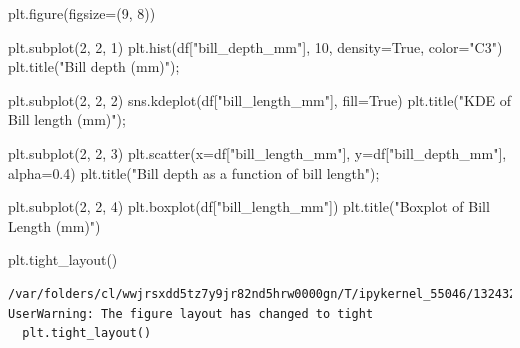\documentclass[
  letterpaper,
  krantz2]{{[}./krantz{]}}
\newenvironment{Shaded}{\begin{snugshade}}{\end{snugshade}}
\newcommand{\DecValTok}[1]{\textcolor[rgb]{0.68,0.00,0.00}{#1}}
\newcommand{\FloatTok}[1]{\textcolor[rgb]{0.68,0.00,0.00}{#1}}
\newcommand{\NormalTok}[1]{\textcolor[rgb]{0.00,0.23,0.31}{#1}}
\newcommand{\OperatorTok}[1]{\textcolor[rgb]{0.37,0.37,0.37}{#1}}
\newcommand{\StringTok}[1]{\textcolor[rgb]{0.13,0.47,0.30}{#1}}
\newcommand{\VariableTok}[1]{\textcolor[rgb]{0.07,0.07,0.07}{#1}}
\begin{document}
\begin{Shaded}
\begin{Highlighting}[]
\NormalTok{plt.figure(figsize}\OperatorTok{=}\NormalTok{(}\DecValTok{9}\NormalTok{, }\DecValTok{8}\NormalTok{))}

\NormalTok{plt.subplot(}\DecValTok{2}\NormalTok{, }\DecValTok{2}\NormalTok{, }\DecValTok{1}\NormalTok{)}
\NormalTok{plt.hist(df[}\StringTok{"bill\_depth\_mm"}\NormalTok{], }\DecValTok{10}\NormalTok{, density}\OperatorTok{=}\VariableTok{True}\NormalTok{, color}\OperatorTok{=}\StringTok{"C3"}\NormalTok{)}
\NormalTok{plt.title(}\StringTok{"Bill depth (mm)"}\NormalTok{)}\OperatorTok{;}

\NormalTok{plt.subplot(}\DecValTok{2}\NormalTok{, }\DecValTok{2}\NormalTok{, }\DecValTok{2}\NormalTok{)}
\NormalTok{sns.kdeplot(df[}\StringTok{"bill\_length\_mm"}\NormalTok{], fill}\OperatorTok{=}\VariableTok{True}\NormalTok{)}
\NormalTok{plt.title(}\StringTok{"KDE of Bill length (mm)"}\NormalTok{)}\OperatorTok{;}

\NormalTok{plt.subplot(}\DecValTok{2}\NormalTok{, }\DecValTok{2}\NormalTok{, }\DecValTok{3}\NormalTok{)}
\NormalTok{plt.scatter(x}\OperatorTok{=}\NormalTok{df[}\StringTok{"bill\_length\_mm"}\NormalTok{], y}\OperatorTok{=}\NormalTok{df[}\StringTok{"bill\_depth\_mm"}\NormalTok{], alpha}\OperatorTok{=}\FloatTok{0.4}\NormalTok{)}
\NormalTok{plt.title(}\StringTok{"Bill depth as a function of bill length"}\NormalTok{)}\OperatorTok{;}

\NormalTok{plt.subplot(}\DecValTok{2}\NormalTok{, }\DecValTok{2}\NormalTok{, }\DecValTok{4}\NormalTok{)}
\NormalTok{plt.boxplot(df[}\StringTok{"bill\_length\_mm"}\NormalTok{])}
\NormalTok{plt.title(}\StringTok{"Boxplot of Bill Length (mm)"}\NormalTok{)}

\NormalTok{plt.tight\_layout()}
\end{Highlighting}
\end{Shaded}

\begin{verbatim}
/var/folders/cl/wwjrsxdd5tz7y9jr82nd5hrw0000gn/T/ipykernel_55046/1324325854.py:19: UserWarning: The figure layout has changed to tight
  plt.tight_layout()
\end{verbatim}
\end{document}
